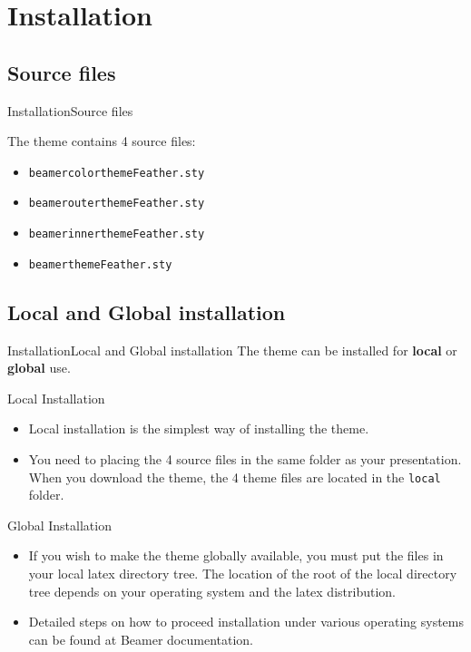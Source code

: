 \documentclass[10pt]{beamer}
\begin{document}
\section{Installation}
\subsection{Source files}
\begin{frame}{Installation}{Source files}

\begin{block}{}
The theme contains 4 source files:
  \begin{itemize}
    \item {\tt beamercolorthemeFeather.sty}
    \item {\tt beamerouterthemeFeather.sty}
    \item {\tt beamerinnerthemeFeather.sty}
    \item {\tt beamerthemeFeather.sty}
  \end{itemize}
\end{block}
\end{frame}

\subsection{Local and Global installation}
\begin{frame}{Installation}{Local and Global installation}
  The theme can be installed for \textbf{local} or \textbf{global} use.
  \pause
  \begin{block}{Local Installation}
  \begin{itemize}    
    \item Local installation is the simplest way of installing the theme. 
    \item You need to placing the 4 source files in the same folder as your presentation. When you download the theme, the 4 theme files are located in the {\tt local} folder.
  \end{itemize}
  \end{block}

  \begin{block}{Global Installation}
  \begin{itemize}
     \item If you wish to make the theme globally available, you must put the files in your local latex directory tree. The location of the root of the local directory tree depends on your operating system and the latex distribution. 
     \item Detailed steps on how to proceed installation under various operating systems can be found at Beamer documentation.
  \end{itemize}
  \end{block}
\end{frame}
     
\end{document}
